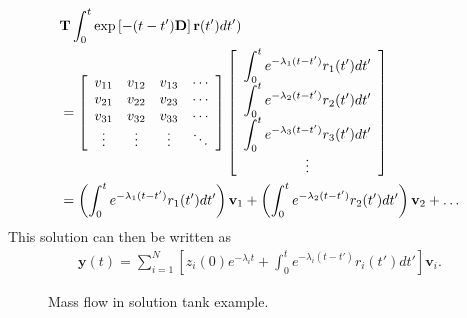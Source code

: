 \begin{align}
 &\mathbf{T} \int_0^t  \exp \left[ -( t - t' ) \mathbf{D} \right] \mathbf{r}(t') dt') \nonumber \\ &= 
  \left[ \begin{array}{c c c c}
  v_{11} & v_{12} & v_{13} & \cdots \\
  v_{21} & v_{22} & v_{23} & \cdots \\
  v_{31} & v_{32} & v_{33} & \cdots \\  
  \vdots & \vdots & \vdots & \ddots \\ \end{array} \right]
  \left[ \begin{array}{c}
  \displaystyle\int_0^t e^{-\lambda_1 (t - t')} r_1(t') dt' \\
  \displaystyle\int_0^t e^{-\lambda_2 (t - t')} r_2(t') dt' \\
  \displaystyle\int_0^t e^{-\lambda_3 (t - t')} r_3(t') dt' \\
  \vdots \\ \end{array} \right]  \nonumber \\
  &= 
    \left( \int_0^t e^{-\lambda_1 (t - t')} r_1(t') dt' \right) \mathbf{v}_1 
  + \left( \int_0^t e^{-\lambda_2 (t - t')} r_2(t') dt' \right) \mathbf{v}_2 + \ldots
\end{align}
This solution can then be written as
\begin{align}
  \mathbf{y}(t)  = \sum_{i=1}^N \left[ z_i(0) e^{-\lambda_i t}  + \int_0^t e^{-\lambda_i (t - t')} r_i(t') dt' \right] \mathbf{v}_i .
\end{align}

\begin{figure}[htp!]
\begin{center}
\caption{Mass flow in solution tank example.}
\label{Fig:ode_massFlowExample}
\end{center}
\end{figure}

